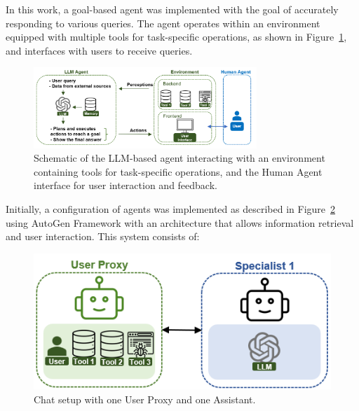         
            In this work, a goal-based agent \citep{Russell2020} was implemented with the goal of accurately responding to various queries. 
            The agent operates within an environment equipped with multiple tools for task-specific operations, as shown in Figure~\ref{fig:agent_environment}, and interfaces with users to receive queries.
            
            \begin{figure}[h]
                \centering
                \includegraphics[width=0.75\textwidth]{images/agent_environment_4.png}
                \caption{Schematic of the LLM-based agent interacting with an environment containing tools for task-specific operations, and the Human Agent interface for user interaction and feedback.}
                \label{fig:agent_environment}
            \end{figure}           
            
            Initially, a configuration of agents was implemented as described in Figure~\ref{fig:agent_config_1} using AutoGen Framework \citep{Wu2023} with an architecture that allows information retrieval and user interaction. This system consists of:

            \begin{figure}[h]
                \centering
                \includegraphics[width=.5\textwidth]{images/agent_config_1.png}
                \caption{Chat setup with one User Proxy \citep{Wu2023} and one Assistant.}
                \label{fig:agent_config_1}
            \end{figure}
            

